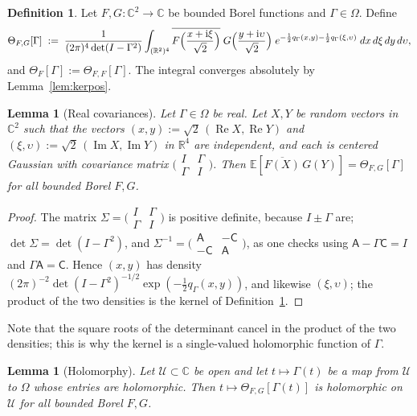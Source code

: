 \documentclass[11pt,reqno]{amsart}
\newtheorem{lemma}[theorem]{Lemma}
\theoremstyle{definition}
\newtheorem{definition}[theorem]{Definition}
\numberwithin{equation}{section}
\newcommand{\C}{\mathbb{C}}
\newcommand{\R}{\mathbb{R}}
\newcommand{\E}{\mathbb{E}}
\newcommand{\ii}{\mathrm{i}}
\newcommand{\Om}{\Omega}
\newcommand{\sA}{\mathsf{A}}
\newcommand{\sC}{\mathsf{C}}
\DeclareMathOperator{\RePart}{Re}
\DeclareMathOperator{\ImPart}{Im}
\begin{document}
\begin{definition}\label{def:theta-matrix}
Let $F,G:\C^2\to\C$ be bounded Borel functions and $\Gamma\in\Om$. Define
\[
  \Theta_{F,G}[\Gamma]\;:=\;\frac{1}{(2\pi)^{4}\det(I-\Gamma^2)}\int_{(\R^2)^4}\overline{F\Bigl(\frac{x+\ii\xi}{\sqrt2}\Bigr)}\;G\Bigl(\frac{y+\ii\upsilon}{\sqrt2}\Bigr)\;e^{-\frac12q_\Gamma(x,y)-\frac12q_\Gamma(\xi,\upsilon)}\;dx\,d\xi\,dy\,d\upsilon ,
\]
and $\Theta_F[\Gamma]:=\Theta_{F,F}[\Gamma]$. The integral converges absolutely by Lemma~\ref{lem:kerpos}.
\end{definition}

\begin{lemma}[Real covariances]\label{lem:real-cov}
Let $\Gamma\in\Om$ be real. Let $X,Y$ be random vectors in $\C^2$ such that the vectors $(x,y):=\sqrt2\,(\RePart X,\RePart Y)$ and $(\xi,\upsilon):=\sqrt2\,(\ImPart X,\ImPart Y)$ in $\R^4$ are independent, and each is centered Gaussian with covariance matrix $\bigl(\begin{smallmatrix}I&\Gamma\\ \Gamma&I\end{smallmatrix}\bigr)$. Then $\E[\overline{F(X)}\,G(Y)]=\Theta_{F,G}[\Gamma]$ for all bounded Borel $F,G$.
\end{lemma}

\begin{proof}
The matrix $\Sigma=\bigl(\begin{smallmatrix}I&\Gamma\\ \Gamma&I\end{smallmatrix}\bigr)$ is positive definite, because $I\pm\Gamma$ are; $\det\Sigma=\det(I-\Gamma^2)$, and $\Sigma^{-1}=\bigl(\begin{smallmatrix}\sA&-\sC\\ -\sC&\sA\end{smallmatrix}\bigr)$, as one checks using $\sA-\Gamma\sC=I$ and $\Gamma\sA=\sC$. Hence $(x,y)$ has density $(2\pi)^{-2}\det(I-\Gamma^2)^{-1/2}\exp(-\frac12q_\Gamma(x,y))$, and likewise $(\xi,\upsilon)$; the product of the two densities is the kernel of Definition~\ref{def:theta-matrix}.
\end{proof}

Note that the square roots of the determinant cancel in the product of the two densities; this is why the kernel is a single-valued holomorphic function of $\Gamma$.

\begin{lemma}[Holomorphy]\label{lem:holo}
Let $\mathcal{U}\subset\C$ be open and let $t\mapsto\Gamma(t)$ be a map from $\mathcal{U}$ to $\Om$ whose entries are holomorphic. Then $t\mapsto\Theta_{F,G}[\Gamma(t)]$ is holomorphic on $\mathcal{U}$ for all bounded Borel $F,G$.
\end{lemma}
\end{document}
